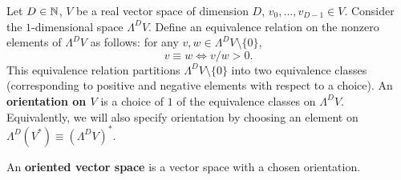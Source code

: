\begin{definition}
  Let
    $D \in \mathbb{N}$,
    $V$ be a real vector space of dimension $D$,
    $v_0, ..., v_{D - 1} \in V$.
  Consider the $1$-dimensional space $\Lambda^D V$.
  Define an equivalence relation on the nonzero elements of $\Lambda^D V$
  as follows: for any $v, w \in \Lambda^D V \setminus \{0\}$,
  \begin{equation}
    v \equiv w \Leftrightarrow v / w > 0.
  \end{equation}
  This equivalence relation partitions $\Lambda^D V \setminus \{0\}$ into two
  equivalence classes
  (corresponding to positive and negative elements with respect to a choice).
  An \textbf{orientation on $V$} is a choice of $1$ of the equivalence classes
  on $\Lambda^D V$.
  Equivalently, we will also specify orientation by choosing an element on
  $\Lambda^D (V^*) \equiv (\Lambda^D V)^*$.

  An \textbf{oriented vector space} is a vector space with a chosen orientation.
\end{definition}
